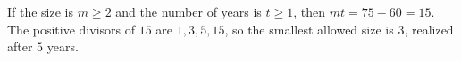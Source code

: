 If the size is $m\ge2$ and the number of years is $t\ge1$, then $mt=75-60=15$. The positive divisors of $15$ are $1,3,5,15$, so the smallest allowed size is $\boxed3$, realized after $5$ years.
